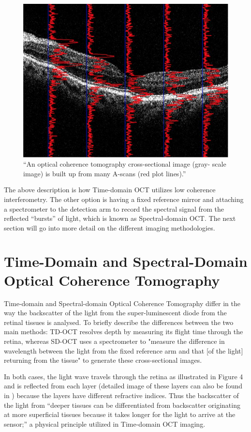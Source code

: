 \begin{figure}[htbp]
\centering
 \includegraphics{figures/morgan_3}
\caption{“An optical coherence tomography cross-sectional image (gray- scale image) is built up from many A-scans (red plot lines).” \cite{mbib_6} }
\label{fig:m_3}
\end{figure}


The above description is how Time-domain OCT utilizes low coherence interferometry.
The other option is having a fixed reference mirror and attaching a spectrometer to
the detection arm to record the spectral signal from the reflected “bursts” of light,
which is known as Spectral-domain OCT.\cite{mbib_3} The next section will go into
more detail on the different imaging methodologies.

\section{Time-Domain and Spectral-Domain Optical Coherence Tomography}
Time-domain and Spectral-domain Optical Coherence Tomography differ in the way
the backscatter of the light from the super-luminescent diode from the retinal
tissues is analysed.  To briefly describe the differences between the two main
methods: TD-OCT resolves depth by measuring its flight time through the retina,
whereas SD-OCT uses a spectrometer to "measure the difference in wavelength
between the light from the fixed reference arm and that [of the light] returning
from the tissue" to generate these cross-sectional images.\cite{mbib_7} 

In both cases, the light wave travels through the retina as illustrated in Figure
4 and is reflected from each layer (detailed image of these layers can also be
found in  ) because the layers have different refractive indices.
Thus the backscatter of the light from “deeper tissues can be differentiated from
backscatter originating at more superficial tissues because it takes longer for
the light to arrive at the sensor;” a physical principle utilized
in Time-domain OCT imaging.\cite{mbib_4}

